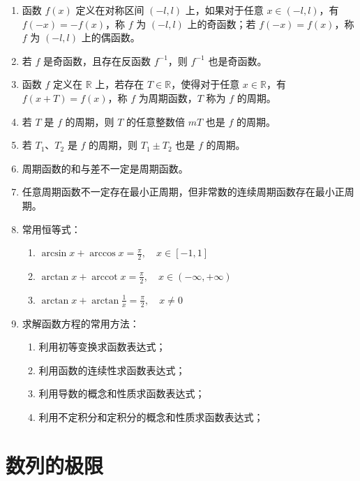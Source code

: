 \documentclass[UTF8]{ctexart}
\theoremstyle{remark}
\begin{document}
\begin{enumerate}
		\item 函数 $ f(x) $ 定义在对称区间 $ (-l, l) $ 上，如果对于任意 $ x \in (-l, l) $，有 $ f(-x) = -f(x) $，称 $ f $ 为 $ (-l, l) $ 上的奇函数；若 $ f(-x) = f(x) $，称 $ f $ 为 $ (-l, l) $ 上的偶函数。
		
		\item 若 $ f $ 是奇函数，且存在反函数 $ f^{-1} $，则 $ f^{-1} $ 也是奇函数。
		
		\item 函数 $ f $ 定义在 $ \mathbb{R} $ 上，若存在 $ T \in \mathbb{R} $，使得对于任意 $ x \in \mathbb{R} $，有 $ f(x + T) = f(x) $，称 $ f $ 为周期函数，$ T $ 称为 $ f $ 的周期。
		
		\item 若 $ T $ 是 $ f $ 的周期，则 $ T $ 的任意整数倍 $ mT $ 也是 $ f $ 的周期。
		
		\item 若 $ T_1 $、$ T_2 $ 是 $ f $ 的周期，则 $ T_1 \pm T_2 $ 也是 $ f $ 的周期。
		
		\item 周期函数的和与差不一定是周期函数。
		
		\item 任意周期函数不一定存在最小正周期，但非常数的连续周期函数存在最小正周期。
		
		\item 常用恒等式：
		\begin{enumerate}
			\item $ \arcsin x + \arccos x = \frac{\pi}{2}, \quad x \in [-1, 1] $
			\item $ \arctan x + \operatorname{arccot} x = \frac{\pi}{2}, \quad x \in (-\infty, +\infty) $
			\item $ \arctan x + \arctan \frac{1}{x} = \frac{\pi}{2}, \quad x \neq 0 $
		\end{enumerate}
		
		\item 求解函数方程的常用方法：
		\begin{enumerate}
			\item 利用初等变换求函数表达式；
			\item 利用函数的连续性求函数表达式；
			\item 利用导数的概念和性质求函数表达式；
			\item 利用不定积分和定积分的概念和性质求函数表达式；
		\end{enumerate}
	\end{enumerate}
	

		
		\section{数列的极限}
		
\end{document}
